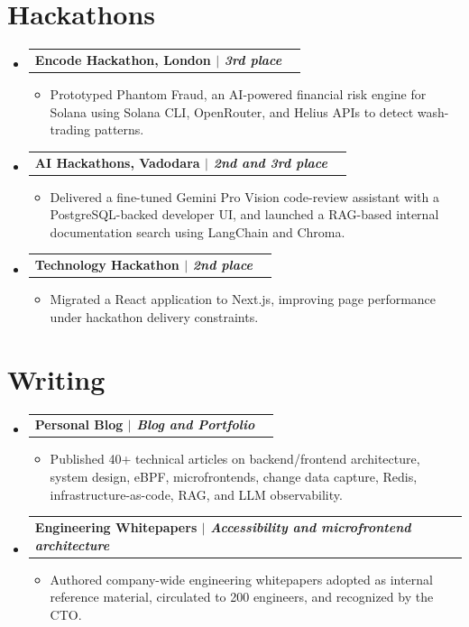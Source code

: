 \documentclass[letterpaper,11pt]{article}
\makeatletter
\newcommand{\resumeItem}[1]{
  \item\small{
    {#1 \vspace{-3pt}}
  }
}
\newcommand{\resumeProjectHeading}[2]{
  \vspace{-3pt}\item
    \begin{tabular*}{1.0\textwidth}[t]{l@{\extracolsep{\fill}}r}
      \textbf{#1} & \textbf{\small #2} \\
    \end{tabular*}\vspace{-7pt}
}
\newcommand{\resumeSubHeadingListStart}{\begin{itemize}[leftmargin=0.0in, label={}]}
\newcommand{\resumeSubHeadingListEnd}{\end{itemize}}
\newcommand{\resumeItemListStart}{\begin{itemize}}
\newcommand{\resumeItemListEnd}{\end{itemize}\vspace{0pt}}
\makeatother
\begin{document}
\section{Hackathons}
\resumeSubHeadingListStart
  \resumeProjectHeading{Encode Hackathon, London \emph{$|$ 3rd place}}{}
    \resumeItemListStart
      \resumeItem{Prototyped Phantom Fraud, an AI-powered financial risk engine for Solana using Solana CLI, OpenRouter, and Helius APIs to detect wash-trading patterns.}
    \resumeItemListEnd
  \resumeProjectHeading{AI Hackathons, Vadodara \emph{$|$ 2nd and 3rd place}}{}
    \resumeItemListStart
      \resumeItem{Delivered a fine-tuned Gemini Pro Vision code-review assistant with a PostgreSQL-backed developer UI, and launched a RAG-based internal documentation search using LangChain and Chroma.}
    \resumeItemListEnd
  \resumeProjectHeading{Technology Hackathon \emph{$|$ 2nd place}}{}
    \resumeItemListStart
      \resumeItem{Migrated a React application to Next.js, improving page performance under hackathon delivery constraints.}
    \resumeItemListEnd
\resumeSubHeadingListEnd

\section{Writing}
\resumeSubHeadingListStart
  \resumeProjectHeading{Personal Blog \emph{$|$ Blog and Portfolio}}{}
    \resumeItemListStart
      \resumeItem{Published 40+ technical articles on backend/frontend architecture, system design, eBPF, microfrontends, change data capture, Redis, infrastructure-as-code, RAG, and LLM observability.}
    \resumeItemListEnd
  \resumeProjectHeading{Engineering Whitepapers \emph{$|$ Accessibility and microfrontend architecture}}{}
    \resumeItemListStart
      \resumeItem{Authored company-wide engineering whitepapers adopted as internal reference material, circulated to 200 engineers, and recognized by the CTO.}
    \resumeItemListEnd
\resumeSubHeadingListEnd

\end{document}

